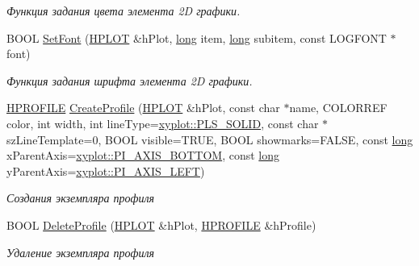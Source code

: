 \begin{DoxyCompactItemize}
\begin{DoxyCompactList}\small\item\em Функция задания цвета элемента 2\-D графики. \end{DoxyCompactList}\item 
B\-O\-O\-L \hyperlink{group__gr_elements_ga94d466cf2a727291630053fb46796a7b}{Set\-Font} (\hyperlink{classxyplot_1_1_h_p_l_o_t}{H\-P\-L\-O\-T} \&h\-Plot, \hyperlink{namespacexyplot_a27bc71b0bdfac09495e7e531d8a918c5}{long} item, \hyperlink{namespacexyplot_a27bc71b0bdfac09495e7e531d8a918c5}{long} subitem, const L\-O\-G\-F\-O\-N\-T $\ast$font)
\begin{DoxyCompactList}\small\item\em Функция задания шрифта элемента 2\-D графики. \end{DoxyCompactList}\item 
\hyperlink{classxyplot_1_1_h_p_r_o_f_i_l_e}{H\-P\-R\-O\-F\-I\-L\-E} \hyperlink{group__gr_output_ga0b66f2af6d72e28697ea2404362bcd08}{Create\-Profile} (\hyperlink{classxyplot_1_1_h_p_l_o_t}{H\-P\-L\-O\-T} \&h\-Plot, const char $\ast$name, C\-O\-L\-O\-R\-R\-E\-F color, int width, int line\-Type=\hyperlink{namespacexyplot_a3d67107a3da8dc1ef0114ab0352e01eda50f3326c8ff8eb69d629156dfe2e268a}{xyplot\-::\-P\-L\-S\-\_\-\-S\-O\-L\-I\-D}, const char $\ast$sz\-Line\-Template=0, B\-O\-O\-L visible=T\-R\-U\-E, B\-O\-O\-L showmarks=F\-A\-L\-S\-E, const \hyperlink{namespacexyplot_a27bc71b0bdfac09495e7e531d8a918c5}{long} x\-Parent\-Axis=\hyperlink{namespacexyplot_aab624afb50724c293bffe01fff26c9c2ae9a92ae30b1ebc969b6a7256f1511924}{xyplot\-::\-P\-I\-\_\-\-A\-X\-I\-S\-\_\-\-B\-O\-T\-T\-O\-M}, const \hyperlink{namespacexyplot_a27bc71b0bdfac09495e7e531d8a918c5}{long} y\-Parent\-Axis=\hyperlink{namespacexyplot_aab624afb50724c293bffe01fff26c9c2a5cab3df16a4e44f280dec6a0108dc09d}{xyplot\-::\-P\-I\-\_\-\-A\-X\-I\-S\-\_\-\-L\-E\-F\-T})
\begin{DoxyCompactList}\small\item\em Создания экземпляра профиля \end{DoxyCompactList}\item 
B\-O\-O\-L \hyperlink{group__gr_output_gaa5a7b664a3f8dbc02402bd1a8926b4c6}{Delete\-Profile} (\hyperlink{classxyplot_1_1_h_p_l_o_t}{H\-P\-L\-O\-T} \&h\-Plot, \hyperlink{classxyplot_1_1_h_p_r_o_f_i_l_e}{H\-P\-R\-O\-F\-I\-L\-E} \&h\-Profile)
\begin{DoxyCompactList}\small\item\em Удаление экземпляра профиля \end{DoxyCompactList}\item 

\end{DoxyCompactItemize}
